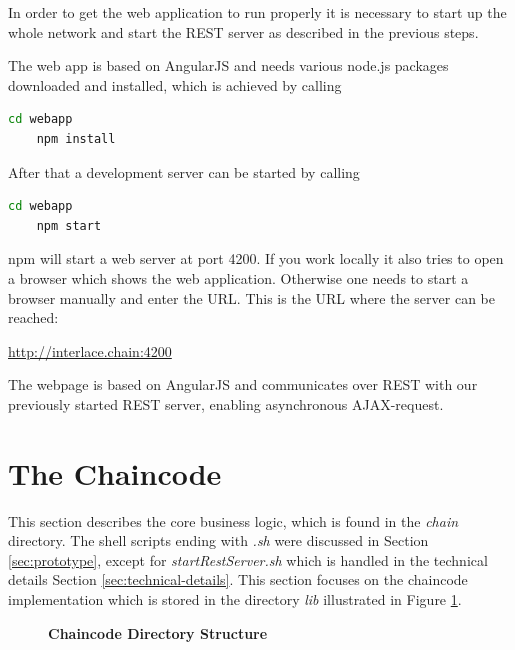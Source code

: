 In order to get the web application to run properly it is necessary to start up the whole network and start the REST server as described in the previous steps.

The web app is based on AngularJS and needs various node.js packages downloaded and installed, which is achieved by calling

\begin{lstlisting}[language=bash]
	cd webapp
	npm install
\end{lstlisting}

After that a development server can be started by calling

\begin{lstlisting}[language=bash]
	cd webapp
	npm start
\end{lstlisting}

npm will start a web server at port 4200. If you work locally it also tries to open a browser which shows the web application. Otherwise one needs to start a browser manually and enter the URL. This is the URL where the server can be reached:

\url{http://interlace.chain:4200}

The webpage is based on AngularJS and communicates over REST with our previously started REST server, enabling asynchronous AJAX-request.

\section{The Chaincode}
\label{sec:chaincode}

This section describes the core business logic, which is found in the \textit{chain} directory. The shell scripts ending with \textit{.sh} were discussed in Section \ref{sec:prototype}, except for \textit{startRestServer.sh} which is handled in the technical details Section \ref{sec:technical-details}. This section focuses on the chaincode implementation which is stored in the directory \textit{lib} illustrated in Figure \ref{fig:chain-structure}.

\begin{figure}[htbp]
\centering
\begin{minipage}{5cm}
\end{minipage}
\caption{\bf\small Chaincode Directory Structure}
\label{fig:chain-structure}
\end{figure}


